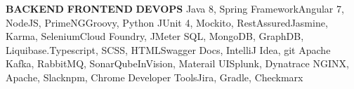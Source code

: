 


\begin{cvskills}


\cvskill
{\textbf{BACKEND}} {\textbf{FRONTEND}} {\textbf{DEVOPS}}
\cvskill
{Java 8, Spring Framework}{Angular 7, NodeJS, PrimeNG}{Groovy, Python}
\cvskill
{JUnit 4, Mockito, RestAssured}{Jasmine, Karma, Selenium}{Cloud Foundry, JMeter}
\cvskill
{SQL, MongoDB, GraphDB, Liquibase.}{Typescript, SCSS, HTML}{Swagger Docs, IntelliJ Idea, git}
\cvskill
{Apache Kafka, RabbitMQ, SonarQube}{InVision, Materail UI}{Splunk, Dynatrace}
\cvskill
{NGINX, Apache, Slack}{npm,  Chrome Developer Tools}{Jira, Gradle, Checkmarx}
\end{cvskills}